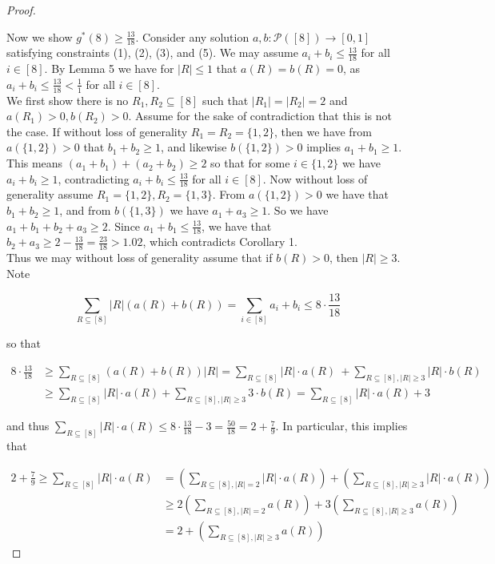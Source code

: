 \documentclass{article}
\begin{document}
\begin{proof}
\begin{center}
\begin{tikzpicture}[declare function={a=4;}]
\end{tikzpicture}
\end{center}

Now we show $g^*(8) \geq \frac{13}{18}$. Consider any solution $a,b : \mathcal{P}([8]) \rightarrow [0,1]$ satisfying constraints (1), (2), (3), and (5). We may assume $a_i + b_i \leq \frac{13}{18}$ for all $i \in [8]$. By Lemma 5 we have for $|R| \leq 1$ that $a(R) = b(R) = 0$, as $a_i+b_i \leq \frac{13}{18} < \frac{1}{1}$ for all $i \in [8]$.  \\

We first show there is no $R_1,R_2 \subseteq [8]$ such that $|R_1| = |R_2| = 2$ and $a(R_1) > 0, b(R_2) > 0$. Assume for the sake of contradiction that this is not the case. If without loss of generality $R_1 = R_2 = \{1,2\}$, then we have from $a(\{1,2\}) > 0$ that $b_1 + b_2 \geq 1$, and likewise $b(\{1,2\}) > 0$ implies $a_1 + b_1 \geq 1$. This means $(a_1+b_1) + (a_2+b_2) \geq 2$ so that for some $i \in \{1,2\}$ we have $a_i+b_i \geq 1$, contradicting $a_i + b_i \leq \frac{13}{18}$ for all $i \in [8]$. Now without loss of generality assume $R_1 = \{1,2\}, R_2 = \{1,3\}$. From $a(\{1,2\}) > 0$ we have that $b_1 + b_2 \geq 1$, and from $b(\{1,3\})$ we have $a_1 + a_3 \geq 1$. So we have $a_1 + b_1 + b_2 + a_3 \geq 2$. Since $a_1 + b_1 \leq \frac{13}{18}$, we have that $b_2 + a_3 \geq 2 - \frac{13}{18} = \frac{23}{18} > 1.02$, which contradicts Corollary 1. \\

Thus we may without loss of generality assume that if $b(R) > 0$, then $|R| \geq 3$. Note

$$\sum_{R \subseteq [8]} |R|(a(R) + b(R)) = \sum_{i \in [8]} a_i + b_i \leq 8 \cdot \frac{13}{18} $$

\noindent
so that

\begin{align*}
8 \cdot \frac{13}{18} &\geq \sum_{R \subseteq [8]} (a(R) + b(R))|R| = \sum_{R \subseteq [8]} |R| \cdot a(R) \ + \sum_{R \subseteq [8], |R| \geq 3} |R| \cdot b(R) \\
&\geq \sum_{R \subseteq [8]} |R| \cdot a(R) + \sum_{R \subseteq [8], |R| \geq 3} 3 \cdot b(R)  = \sum_{R \subseteq [8]} |R| \cdot a(R) + 3
\end{align*}

\noindent
and thus $\sum_{R \subseteq [8]} |R| \cdot a(R) \leq 8 \cdot \frac{13}{18} - 3 = \frac{50}{18} = 2 + \frac{7}{9}$. In particular, this implies that 

\begin{align*}
 2 + \frac{7}{9} \geq \sum_{R \subseteq [8]} |R| \cdot a(R) &= \left( \sum_{R \subseteq [8], |R| = 2} |R| \cdot a(R) \right) + \left( \sum_{R \subseteq [8], |R| \geq 3} |R| \cdot a(R) \right) \\
 &\geq 2\left( \sum_{R \subseteq [8], |R| = 2} a(R) \right) + 3\left( \sum_{R \subseteq [8], |R| \geq 3} a(R) \right) \\
&= 2 + \left( \sum_{R \subseteq [8], |R| \geq 3} a(R) \right)
\end{align*}


\end{proof}
\end{document}

